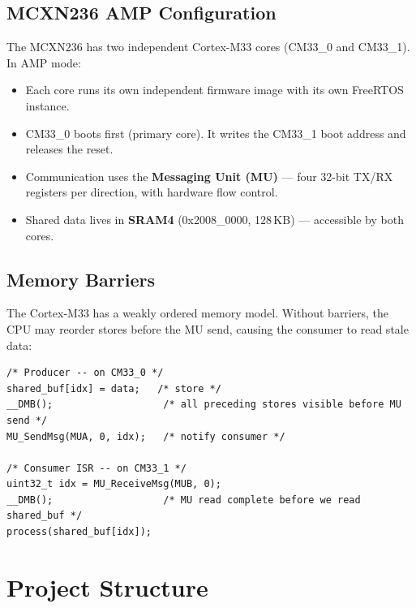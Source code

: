 \documentclass[11pt, a4paper]{article}
\begin{document}
\subsection{MCXN236 AMP Configuration}

The MCXN236 has two independent Cortex-M33 cores (CM33\_0 and CM33\_1). In AMP mode:

\begin{itemize}[noitemsep, leftmargin=*]
  \item Each core runs its own independent firmware image with its own FreeRTOS instance.
  \item CM33\_0 boots first (primary core). It writes the CM33\_1 boot address and
        releases the reset.
  \item Communication uses the \textbf{Messaging Unit (MU)} --- four 32-bit TX/RX
        registers per direction, with hardware flow control.
  \item Shared data lives in \textbf{SRAM4} (0x2008\_0000, 128\,KB) --- accessible by
        both cores.
\end{itemize}

\subsection{Memory Barriers}

The Cortex-M33 has a weakly ordered memory model. Without barriers, the CPU may
reorder stores before the MU send, causing the consumer to read stale data:

\begin{lstlisting}[style=cstyle]
/* Producer -- on CM33_0 */
shared_buf[idx] = data;   /* store */
__DMB();                   /* all preceding stores visible before MU send */
MU_SendMsg(MUA, 0, idx);   /* notify consumer */

/* Consumer ISR -- on CM33_1 */
uint32_t idx = MU_ReceiveMsg(MUB, 0);
__DMB();                   /* MU read complete before we read shared_buf */
process(shared_buf[idx]);
\end{lstlisting}

\section{Project Structure}
\end{document}
